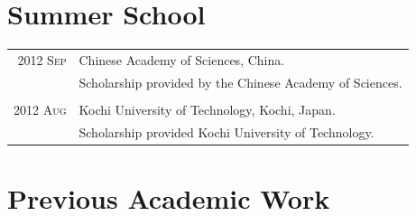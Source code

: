 \documentclass[a4paper,10pt]{article}
\begin{document}
\section{Summer School}
\begin{tabular}{r|p{13cm}}

  \textsc{2012 Sep}  & Chinese Academy of Sciences, China. \\
                     & Scholarship provided by the Chinese Academy of Sciences. \\
  \multicolumn{2}{c}{}\\
  \textsc{2012 Aug}  & Kochi University of Technology, Kochi, Japan. \\
                     & Scholarship provided Kochi University of Technology.
\end{tabular}

\section{Previous Academic Work}


\end{document}
